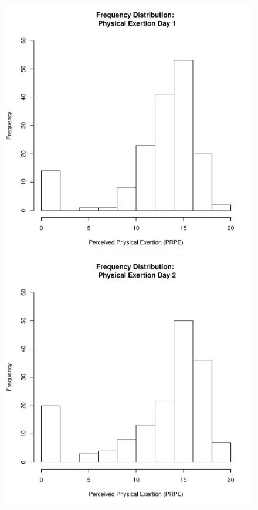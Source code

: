 \documentclass[12pt]{report}
\begin{document}
{%
\begin{figure}[htbp]
  \includegraphics[scale =.4]{../images/distPrpeDay1.pdf}
  \includegraphics[scale =.4]{../images/distPrpeDay2.pdf}

\end{figure}}
\end{document}

